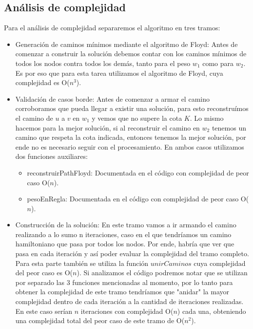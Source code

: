 \newpage
\subsection{An\'alisis de complejidad}
Para el an\'alisis de complejidad separaremos el algoritmo en tres tramos:
\begin{itemize}
\item Generaci\'on de caminos m\'inimos mediante el algoritmo de Floyd:
	Antes de comenzar a construir la soluci\'on debemos contar con los caminos m\'inimos de todos los nodos contra todos los dem\'as, tanto para el peso $w_1$ como para $w_2$. Es por eso que para esta tarea utilizamos el algoritmo de Floyd, cuya complejidad es O($n^3$). 
\item Validaci\'on de casos borde:
	Antes de comenzar a armar el camino corroboramos que pueda llegar a existir una soluci\'on, para esto reconstru\'imos el camino de $u$ a $v$ en $w_1$ y vemos que no supere la cota $K$. 
	Lo mismo hacemos para la mejor soluci\'on, si al reconstruir el camino en $w_2$ tenemos un camino que respeta la cota indicada, entonces tenemos la mejor soluci\'on, por ende no es necesario seguir con el procesamiento.
	En ambos casos utilizamos dos funciones auxiliares:
	\begin{itemize}
	\item reconstruirPathFloyd: Documentada en el c\'odigo con complejidad de peor caso O($n$).
	\item pesoEnRegla: Documentada en el c\'odigo con complejidad de peor caso O($n$).
	\end{itemize}
\item Construcci\'on de la soluci\'on:
	En este tramo vamos a ir armando el camino realizando a lo sumo n iteraciones, caso en el que tendr\'iamos un camino hamiltoniano que pasa por todos los nodos. Por ende, habr\'ia que ver que pasa en cada iteraci\'on y as\'i poder evaluar la complejidad del tramo completo.
	Para esta parte tambi\'en se utiliza la funci\'on $unirCaminos$ cuya complejidad del peor caso es O($n$).
	Si analizamos el c\'odigo podremos notar que se utilizan por separado las 3 funciones mencionadas al momento, por lo tanto para obtener la complejidad de este tramo tendr\'iamos que "anidar" la mayor complejidad dentro de cada iteraci\'on a la cantidad de iteraciones realizadas. En este caso ser\'ian $n$ iteraciones con complejidad O($n$) cada una, obteniendo una complejidad total del peor caso de este tramo de O($n^2$).
\end{itemize}

